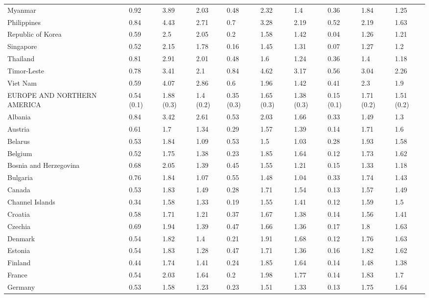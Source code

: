 \begin{longtable}[t]{llllllllll}
Myanmar & 0.92 & 3.89 & 2.03 & 0.48 & 2.32 & 1.4 & 0.36 & 1.84 & 1.25\\
Philippines & 0.84 & 4.43 & 2.71 & 0.7 & 3.28 & 2.19 & 0.52 & 2.19 & 1.63\\
Republic of Korea & 0.59 & 2.5 & 2.05 & 0.2 & 1.58 & 1.42 & 0.04 & 1.26 & 1.21\\
Singapore & 0.52 & 2.15 & 1.78 & 0.16 & 1.45 & 1.31 & 0.07 & 1.27 & 1.2\\
Thailand & 0.81 & 2.91 & 2.01 & 0.48 & 1.6 & 1.24 & 0.36 & 1.4 & 1.18\\
Timor-Leste & 0.78 & 3.41 & 2.1 & 0.84 & 4.62 & 3.17 & 0.56 & 3.04 & 2.26\\
Viet Nam & 0.59 & 4.07 & 2.86 & 0.6 & 1.96 & 1.42 & 0.41 & 2.3 & 1.9\\
EUROPE AND NORTHERN AMERICA & 0.54 (0.1) & 1.88 (0.3) & 1.4 (0.2) & 0.35 (0.3) & 1.65 (0.3) & 1.38 (0.3) & 0.15 (0.1) & 1.71 (0.2) & 1.51 (0.2)\\
Albania & 0.84 & 3.42 & 2.61 & 0.53 & 2.03 & 1.66 & 0.33 & 1.49 & 1.3\\
Austria & 0.61 & 1.7 & 1.34 & 0.29 & 1.57 & 1.39 & 0.14 & 1.71 & 1.6\\
Belarus & 0.53 & 1.84 & 1.09 & 0.53 & 1.5 & 1.03 & 0.28 & 1.93 & 1.58\\
Belgium & 0.52 & 1.75 & 1.38 & 0.23 & 1.85 & 1.64 & 0.12 & 1.73 & 1.62\\
Bosnia and Herzegovina & 0.68 & 2.05 & 1.39 & 0.45 & 1.55 & 1.21 & 0.15 & 1.33 & 1.18\\
Bulgaria & 0.76 & 1.84 & 1.07 & 0.55 & 1.48 & 1.04 & 0.33 & 1.74 & 1.43\\
Canada & 0.53 & 1.83 & 1.49 & 0.28 & 1.71 & 1.54 & 0.13 & 1.57 & 1.49\\
Channel Islands & 0.34 & 1.58 & 1.33 & 0.19 & 1.55 & 1.41 & 0.12 & 1.59 & 1.5\\
Croatia & 0.58 & 1.71 & 1.21 & 0.37 & 1.67 & 1.38 & 0.14 & 1.56 & 1.41\\
Czechia & 0.69 & 1.94 & 1.39 & 0.47 & 1.66 & 1.36 & 0.17 & 1.8 & 1.63\\
Denmark & 0.54 & 1.82 & 1.4 & 0.21 & 1.91 & 1.68 & 0.12 & 1.76 & 1.63\\
Estonia & 0.54 & 1.83 & 1.28 & 0.47 & 1.71 & 1.36 & 0.16 & 1.82 & 1.62\\
Finland & 0.44 & 1.74 & 1.41 & 0.24 & 1.85 & 1.64 & 0.14 & 1.48 & 1.38\\
France & 0.54 & 2.03 & 1.64 & 0.2 & 1.98 & 1.77 & 0.14 & 1.83 & 1.7\\
Germany & 0.53 & 1.58 & 1.23 & 0.23 & 1.51 & 1.33 & 0.13 & 1.75 & 1.64\\

\end{longtable}
